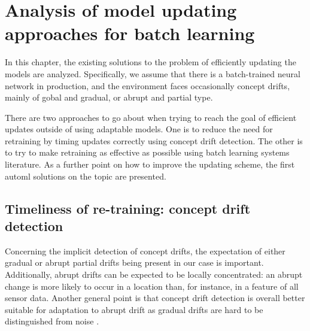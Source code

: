 \chapter{Analysis of model updating approaches for batch learning}


In this chapter, the existing solutions to the problem of efficiently updating the models are analyzed. Specifically, we assume that there is a batch-trained neural network in production, and the environment faces occasionally concept drifts, mainly of gobal and gradual, or abrupt and partial type.

There are two approaches to go about when trying to reach the goal of efficient updates outside of using adaptable models. One is to reduce the need for retraining by timing updates correctly using concept drift detection. The other is to try to make retraining as effective as possible using batch learning systems literature. As a further point on how to improve the updating scheme, the first automl solutions on the topic are presented.


\section{Timeliness of re-training: concept drift detection}


Concerning the implicit detection of concept drifts, the expectation of either gradual or abrupt partial drifts being present in our case is important. Additionally, abrupt drifts can be expected to be locally concentrated: an abrupt change is more likely to occur in a location than, for instance, in a feature of all sensor data. Another general point is that concept drift detection is overall better suitable for adaptation to abrupt drift as gradual drifts are hard to be distinguished from noise \cite{zliobaiteLearningConceptDrift2010}. 

